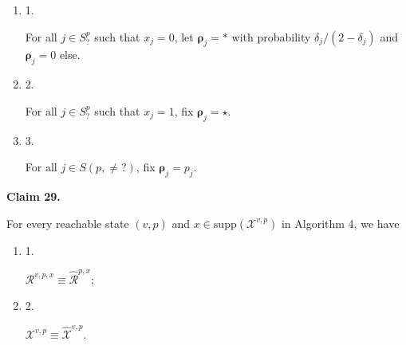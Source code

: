 \documentclass[10pt,a4paper]{article}
\begin{document}
\begin{enumerate}


\item[] 
1. 


For all $j\in S^{p}_{\mathord{?}}$ such that $x_{j}=0$, let $\bm{\rho}_{j}=*$ with probability $\delta_{j}/(2-\delta_{j})$ and $\bm{\rho}_{j}=0$ else.\par





\item[] 
2. 


For all $j\in S^{p}_{\mathord{?}}$ such that $x_{j}=1$, fix $\bm{\rho}_{j}=\star$.\par





\item[] 
3. 


For all $j\in S(p,\neq\mathord{?})$, fix $\bm{\rho}_{j}=p_{j}$.\par





\end{enumerate}





\par\medskip\noindent\textbf{
Claim 29. 
}\par



For every reachable state $(v,p)$ and $x\in\mathrm{supp}(\mathcal{X}^{v,p})$ in Algorithm 4, we have\par


\begin{enumerate}


\item[] 
1. 


$\mathcal{R}^{v,p,x}\equiv\widehat{\mathcal{R}}^{p,x}$;\par





\item[] 
2. 


$\mathcal{X}^{v,p}\equiv\widehat{\mathcal{X}}^{v,p}$.\par





\end{enumerate}
\end{document}
